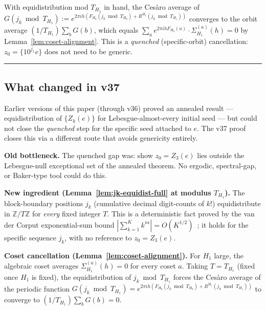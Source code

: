 \documentclass[
]{article}
\begin{document}
With equidistribution mod $T_{H_1}$ in hand, the Cesàro average of
$G(j_k\bmod T_{H_1}) := e^{2\pi ih(F_{H_0}(j_k\bmod T_{H_0})+R^{H_1}(j_k\bmod T_{H_1}))}$
converges to the orbit average $(1/T_{H_1})\sum_b G(b)$,
which equals $\sum_a e^{2\pi ih F_{H_0}(a)}\cdot\Sigma_{H_1}^{(a)}(h)=0$
by Lemma~\ref{lem:coset-alignment}.
This is a \emph{quenched} (specific-orbit) cancellation:
$z_0 = \{10^{j_1}e\}$ does not need to be generic.

\begin{center}\rule{0.5\linewidth}{0.5pt}\end{center}

\subsection{What changed in v37}\label{sec:what-changed-v37}

Earlier versions of this paper (through v36) proved an annealed result
--- equidistribution of $\{Z_k(e)\}$ for Lebesgue-almost-every initial
seed --- but could not close the \emph{quenched} step for the specific
seed attached to $e$.
The v37 proof closes this via a different route that avoids genericity
entirely.

\medskip\noindent\textbf{Old bottleneck.}
The quenched gap was: show $z_0 = Z_3(e)$ lies outside the Lebesgue-null
exceptional set of the annealed theorem.
No ergodic, spectral-gap, or Baker-type tool could do this.

\medskip\noindent\textbf{New ingredient (Lemma~\ref{lem:jk-equidist-full}
at modulus $T_{H_1}$).}
The block-boundary positions $j_k$ (cumulative decimal digit-counts of $k!$)
equidistribute in $\mathbb{Z}/T\mathbb{Z}$ for \emph{every} fixed integer $T$.
This is a deterministic fact proved by the van der Corput exponential-sum
bound $|\sum_{k=1}^K k^{i\alpha}|=O(K^{1/2})$~\cite{Weyl16,VdC31}; it holds
for the specific sequence $j_k$, with no reference to $z_0 = Z_3(e)$.

\medskip\noindent\textbf{Coset cancellation
(Lemma~\ref{lem:coset-alignment}).}
For $H_1$ large, the algebraic coset averages
$\Sigma_{H_1}^{(a)}(h) = 0$ for every coset $a$.
Taking $T = T_{H_1}$ (fixed once $H_1$ is fixed), the equidistribution
of $j_k\bmod T_{H_1}$ forces the Cesàro average of the periodic function
$G(j_k\bmod T_{H_1}) = e^{2\pi ih(F_{H_0}(j_k\bmod T_{H_0})+R^{H_1}(j_k\bmod T_{H_1}))}$
to converge to $(1/T_{H_1})\sum_b G(b) = 0$.
\end{document}
